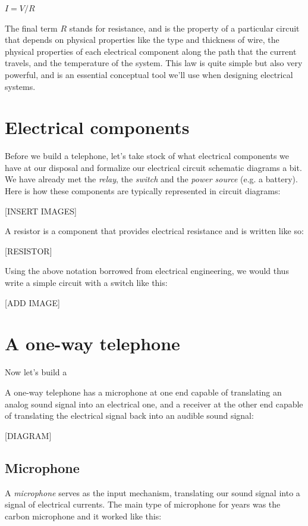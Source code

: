 \documentclass[UTF8]{book}
\begin{document}
\begin{CJK}{UTF8}{gbsn}
$I = V/R$

The final term $R$ stands for resistance, and is the property of a particular circuit that depends on physical properties like the type and thickness of wire, the physical properties of each electrical component along the path that the current travels, and the temperature of the system. This law is quite simple but also very powerful, and is an essential conceptual tool we'll use when designing electrical systems.

\section{Electrical components}

Before we build a telephone, let's take stock of what electrical components we have at our disposal and formalize our electrical circuit schematic diagrams a bit. We have already met the \emph{relay}, the \emph{switch} and the \emph{power source} (e.g. a battery). Here is how these components are typically represented in circuit diagrams:

[INSERT IMAGES]

A resistor is a component that provides electrical resistance and is written like so:

[RESISTOR]

Using the above notation borrowed from electrical engineering, we would thus write a simple circuit with a switch like this:

[ADD IMAGE]





\section{A one-way telephone}

Now let's build a

A one-way telephone has a microphone at one end capable of translating an analog sound signal into an electrical one, and a receiver at the other end capable of translating the electrical signal back into an audible sound signal:

[DIAGRAM]

\subsection{Microphone}

A \emph{microphone} serves as the input mechanism, translating our sound signal into a signal of electrical currents. The main type of microphone for years was the carbon microphone and it worked like this:


\end{CJK}
\end{document}

